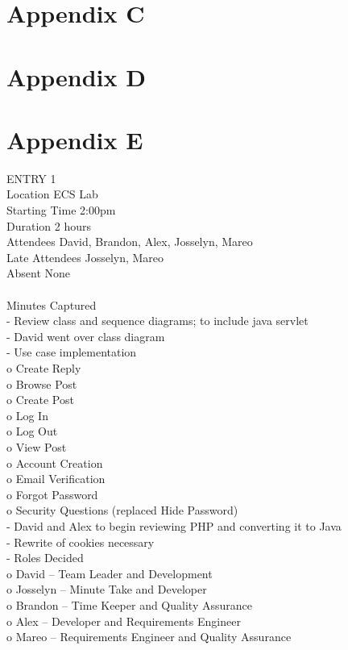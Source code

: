 \documentclass{report}
\begin{document}
\section{Appendix C}
\section{Appendix D}
\section{Appendix E}
ENTRY 1\\	
Location		ECS Lab\\
Starting Time		2:00pm\\
Duration		2 hours\\
Attendees		David, Brandon, Alex, Josselyn, Mareo\\
Late Attendees	Josselyn, Mareo\\
Absent		None\\
\\
Minutes Captured\\
-	Review class and sequence diagrams; to include java servlet\\
-	David went over class diagram\\
-	Use case implementation\\
o	Create Reply\\
o	Browse Post\\
o	Create Post\\
o	Log In\\
o	Log Out\\
o	View Post\\
o	Account Creation\\
o	Email Verification\\
o	Forgot Password\\
o	Security Questions (replaced Hide Password)\\
-	David and Alex to begin reviewing PHP and converting it to Java\\
-	Rewrite of cookies necessary\\
-	Roles Decided\\
o	David – Team Leader and Development\\
o	Josselyn – Minute Take and Developer\\
o	Brandon – Time Keeper and Quality Assurance\\
o	Alex – Developer and Requirements Engineer\\
o	Mareo – Requirements Engineer and Quality Assurance\\
\end{document}
